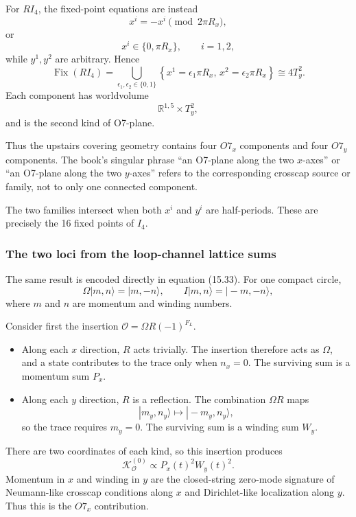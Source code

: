 \documentclass[
  10pt,
  a4paper,
  openany]{book}
\providecommand{\tightlist}{%
  \setlength{\itemsep}{0pt}\setlength{\parskip}{0pt}}
\begin{document}
For \(RI_4\), the fixed-point equations are instead \[
x^i=-x^i
\pmod{2\pi R_x},
\] or \[
x^i\in\{0,\pi R_x\},
\qquad i=1,2,
\] while \(y^1,y^2\) are arbitrary. Hence \[
\boxed{
\operatorname{Fix}(RI_4)
=
\bigcup_{\epsilon_1,\epsilon_2\in\{0,1\}}
\left\{
x^1=\epsilon_1\pi R_x,\,
x^2=\epsilon_2\pi R_x
\right\}
\cong
4T_y^2
}.
\] Each component has worldvolume \[
\mathbb R^{1,5}\times T_y^2,
\] and is the second kind of O7-plane.

Thus the upstairs covering geometry contains four \(O7_x\) components
and four \(O7_y\) components. The book's singular phrase ``an O7-plane
along the two \(x\)-axes'' or ``an O7-plane along the two \(y\)-axes''
refers to the corresponding crosscap source or family, not to only one
connected component.

The two families intersect when both \(x^i\) and \(y^i\) are
half-periods. These are precisely the 16 fixed points of \(I_4\).

\subsubsection{The two loci from the loop-channel lattice
sums}\label{the-two-loci-from-the-loop-channel-lattice-sums}

The same result is encoded directly in equation (15.33). For one compact
circle, \[
\Omega|m,n\rangle
=
|m,-n\rangle,
\qquad
I|m,n\rangle
=
|-m,-n\rangle,
\] where \(m\) and \(n\) are momentum and winding numbers.

Consider first the insertion \(\mathcal O=\Omega R(-1)^{F_L}\).

\begin{itemize}
\tightlist
\item
  Along each \(x\) direction, \(R\) acts trivially. The insertion
  therefore acts as \(\Omega\), and a state contributes to the trace
  only when \(n_x=0\). The surviving sum is a momentum sum \(P_x\).
\item
  Along each \(y\) direction, \(R\) is a reflection. The combination
  \(\Omega R\) maps \[
  |m_y,n_y\rangle
  \longmapsto
  |-m_y,n_y\rangle,
  \] so the trace requires \(m_y=0\). The surviving sum is a winding sum
  \(W_y\).
\end{itemize}

There are two coordinates of each kind, so this insertion produces \[
\mathcal K_{\mathcal O}^{(0)}
\propto
P_x(t)^2W_y(t)^2.
\] Momentum in \(x\) and winding in \(y\) are the closed-string
zero-mode signature of Neumann-like crosscap conditions along \(x\) and
Dirichlet-like localization along \(y\). Thus this is the \(O7_x\)
contribution.
\end{document}
